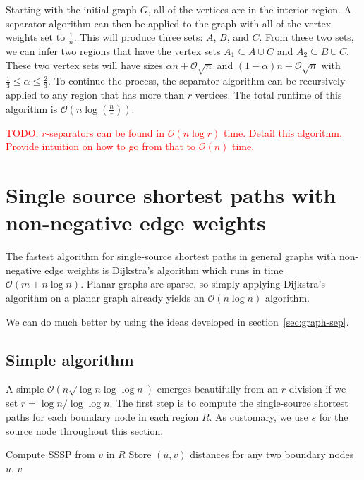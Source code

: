 \documentclass[11pt]{article}
\begin{document}
    Starting with the initial graph $G$, all of the vertices are in the interior region. A separator algorithm can then be applied to the graph with all of the vertex weights set to $\frac{1}{n}$. This will produce three sets: $A$, $B$, and $C$. From these two sets, we can infer two regions that have the vertex sets $A_1 \subseteq A \cup C$ and $A_2 \subseteq B \cup C$. These two vertex sets will have sizes $\alpha n + \mathcal{O}\sqrt{n}$ and $(1 - \alpha) n + \mathcal{O}\sqrt{n}$ with $\frac{1}{3} \leq \alpha \leq \frac{2}{3}$. To continue the process, the separator algorithm can be recursively applied to any region that has more than $r$ vertices. The total runtime of this algorithm is $\mathcal{O} \left (n \log \left (\frac{n}{r} \right ) \right )$.

\textcolor{red}{TODO: $r$-separators can be found in $\mathcal{O}(n\log r)$ time. Detail this algorithm. Provide intuition on how to go from that to $\mathcal{O}(n)$ time.}

\section{Single source shortest paths with non-negative edge weights}
\label{sec:nonn-edge-weights}

The fastest algorithm for single-source shortest paths in general graphs with non-negative edge weights is Dijkstra's algorithm which runs in time $\mathcal{O}(m + n\log n)$. Planar graphs are sparse, so simply applying Dijkstra's algorithm on a planar graph already yields an $\mathcal{O}(n \log n)$ algorithm.

We can do much better by using the ideas developed in section~\ref{sec:graph-sep}.

\subsection{Simple algorithm}
\label{sec:simple-algorithm}

A simple $\mathcal{O}(n\sqrt{\log n \log \log n})$ emerges beautifully from an $r$-division if we set $r = \log n/\log \log n$. The first step is to compute the single-source shortest paths for each boundary node in each region $R$. As customary, we use $s$ for the source node throughout this section.


\begin{algorithm}[!htb]
  \label{alg:sssp-region}
  \begin{algorithmic}
        \State Compute SSSP from $v$ in $R$
        \State Store $(u,v)$ distances for any two boundary nodes $u$, $v$
      \EndFor
    \EndFor
  \end{algorithmic}
\end{algorithm}
\end{document}
